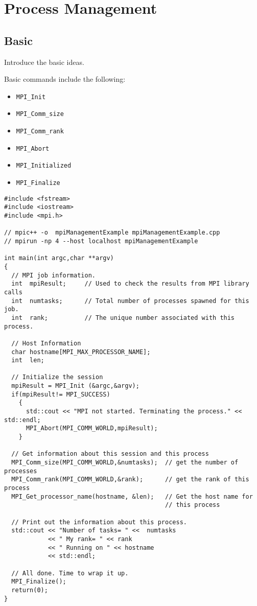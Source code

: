 \chapter{Process Management}

\section{Basic}

Introduce the basic ideas.

Basic commands include the following: \\
\begin{itemize}
\item \texttt{MPI\_Init}
\item \texttt{MPI\_Comm\_size}
\item \texttt{MPI\_Comm\_rank}
\item \texttt{MPI\_Abort}
\item \texttt{MPI\_Initialized}
\item \texttt{MPI\_Finalize}
\end{itemize}



\lstset{language=C++, numbers=left, numberstyle=\tiny, stepnumber=1,
  numbersep=5pt, commentstyle=\scriptsize}
\begin{lstlisting}[caption={Basic Process Information},
                   basicstyle=\scriptsize,
                   label=listing:basicProcess]
#include <fstream>
#include <iostream>
#include <mpi.h>

// mpic++ -o  mpiManagementExample mpiManagementExample.cpp 
// mpirun -np 4 --host localhost mpiManagementExample

int main(int argc,char **argv)
{
  // MPI job information.
  int  mpiResult;     // Used to check the results from MPI library calls
  int  numtasks;      // Total number of processes spawned for this job.
  int  rank;          // The unique number associated with this process.

  // Host Information 
  char hostname[MPI_MAX_PROCESSOR_NAME];
  int  len;

  // Initialize the session
  mpiResult = MPI_Init (&argc,&argv);
  if(mpiResult!= MPI_SUCCESS)
    {
      std::cout << "MPI not started. Terminating the process." << std::endl;
      MPI_Abort(MPI_COMM_WORLD,mpiResult);
    }

  // Get information about this session and this process 
  MPI_Comm_size(MPI_COMM_WORLD,&numtasks);  // get the number of processes
  MPI_Comm_rank(MPI_COMM_WORLD,&rank);      // get the rank of this process
  MPI_Get_processor_name(hostname, &len);   // Get the host name for
                                            // this process

  // Print out the information about this process.
  std::cout << "Number of tasks= " <<  numtasks
            << " My rank= " << rank
            << " Running on " << hostname
            << std::endl;

  // All done. Time to wrap it up.
  MPI_Finalize();
  return(0);
}
\end{lstlisting}


